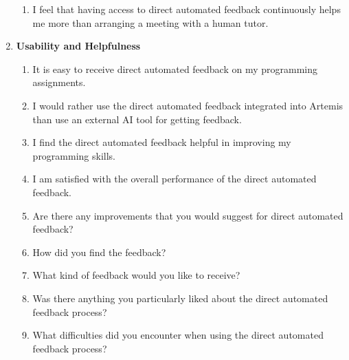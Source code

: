 \documentclass[manuscript,screen,review]{acmart}
\begin{document}
\begin{enumerate}[label=\textbf{RQ\arabic*}]
\begin{enumerate}[label=\textbf{Q\arabic*},resume,ref=Q\arabic*]
      \item \label{Q13} I feel that having access to direct automated feedback continuously helps me more than arranging a meeting with a human tutor.
    \end{enumerate}
  \item \textbf{Usability and Helpfulness}
    \begin{enumerate}[label=\textbf{Q\arabic*},resume,ref=Q\arabic*]
      \item \label{Q14} It is easy to receive direct automated feedback  on my programming assignments.
      \item \label{Q15} I would rather use the direct automated feedback integrated into Artemis than use an external AI tool for getting feedback.
      \item \label{Q16} I find the direct automated feedback helpful in improving my programming skills.
      \item \label{Q17} I am satisfied with the overall performance of the direct automated feedback.
      \item \label{Q18} Are there any improvements that you would suggest for direct automated feedback?
      \item \label{Q19} How did you find the feedback?
      \item \label{Q20} What kind of feedback would you like to receive?
      \item \label{Q21} Was there anything you particularly liked about the direct automated feedback process?
      \item \label{Q22} What difficulties did you encounter when using the direct automated feedback process?
    \end{enumerate}
\end{enumerate}



\end{document}
